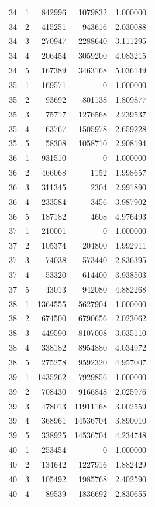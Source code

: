 \begin{longtable}{rrrrr}
34 & 1 & 842996 & 1079832 & 1.000000 \\
34 & 2 & 415251 & 943616 & 2.030088 \\
34 & 3 & 270947 & 2288640 & 3.111295 \\
34 & 4 & 206454 & 3059200 & 4.083215 \\
34 & 5 & 167389 & 3463168 & 5.036149 \\
35 & 1 & 169571 & 0 & 1.000000 \\
35 & 2 & 93692 & 801138 & 1.809877 \\
35 & 3 & 75717 & 1276568 & 2.239537 \\
35 & 4 & 63767 & 1505978 & 2.659228 \\
35 & 5 & 58308 & 1058710 & 2.908194 \\
36 & 1 & 931510 & 0 & 1.000000 \\
36 & 2 & 466068 & 1152 & 1.998657 \\
36 & 3 & 311345 & 2304 & 2.991890 \\
36 & 4 & 233584 & 3456 & 3.987902 \\
36 & 5 & 187182 & 4608 & 4.976493 \\
37 & 1 & 210001 & 0 & 1.000000 \\
37 & 2 & 105374 & 204800 & 1.992911 \\
37 & 3 & 74038 & 573440 & 2.836395 \\
37 & 4 & 53320 & 614400 & 3.938503 \\
37 & 5 & 43013 & 942080 & 4.882268 \\
38 & 1 & 1364555 & 5627904 & 1.000000 \\
38 & 2 & 674500 & 6790656 & 2.023062 \\
38 & 3 & 449590 & 8107008 & 3.035110 \\
38 & 4 & 338182 & 8954880 & 4.034972 \\
38 & 5 & 275278 & 9592320 & 4.957007 \\
39 & 1 & 1435262 & 7929856 & 1.000000 \\
39 & 2 & 708430 & 9166848 & 2.025976 \\
39 & 3 & 478013 & 11911168 & 3.002559 \\
39 & 4 & 368961 & 14536704 & 3.890010 \\
39 & 5 & 338925 & 14536704 & 4.234748 \\
40 & 1 & 253454 & 0 & 1.000000 \\
40 & 2 & 134642 & 1227916 & 1.882429 \\
40 & 3 & 105492 & 1985768 & 2.402590 \\
40 & 4 & 89539 & 1836692 & 2.830655 \\

\end{longtable}

